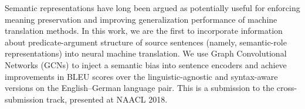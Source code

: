 Semantic representations have long been argued as potentially useful for enforcing meaning preservation and improving generalization performance of machine translation methods. In this work, we are the first to incorporate information about predicate-argument structure of source sentences (namely, semantic-role representations) into neural machine translation. We use Graph Convolutional Networks (GCNs) to inject a semantic bias into sentence encoders and achieve improvements in BLEU scores over the linguistic-agnostic and syntax-aware versions on the English--German language pair. This is a submission to the cross-submission track, presented at NAACL 2018.
